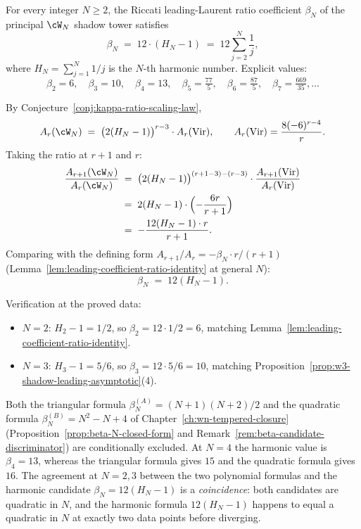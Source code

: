 \begin{conjecture}
\label{conj:beta-N-harmonic-closed-form}
\ClaimStatusConjectured
For every integer $N \ge 2$, the Riccati leading-Laurent ratio coefficient
$\beta_N$ of the principal $\cW_N$ shadow tower satisfies
\begin{equation}
\label{eq:beta-N-closed-form}
\beta_N
\;=\;
12 \cdot (H_N - 1)
\;=\;
12 \sum_{j = 2}^{N} \frac{1}{j},
\end{equation}
where $H_N = \sum_{j=1}^{N} 1/j$ is the $N$-th harmonic number. Explicit
values:
\[
 \beta_2 = 6,\quad \beta_3 = 10,\quad \beta_4 = 13,\quad
 \beta_5 = \tfrac{77}{5},\quad \beta_6 = \tfrac{87}{5},\quad
 \beta_7 = \tfrac{669}{35}, \ldots
\]
\end{conjecture}

\begin{remark}
By Conjecture~\ref{conj:kappa-ratio-scaling-law},
\[
 A_r(\cW_N) \;=\; \bigl(2(H_N - 1)\bigr)^{r-3} \cdot A_r(\mathrm{Vir}),
 \qquad A_r(\mathrm{Vir}) = \frac{8 (-6)^{r-4}}{r}.
\]
Taking the ratio at $r+1$ and $r$:
\begin{align*}
 \frac{A_{r+1}(\cW_N)}{A_r(\cW_N)}
 &\;=\;
 \bigl(2(H_N - 1)\bigr)^{(r+1-3) - (r-3)}
 \cdot \frac{A_{r+1}(\mathrm{Vir})}{A_r(\mathrm{Vir})} \\
 &\;=\;
 2(H_N - 1) \cdot
 \Bigl( -\frac{6 r}{r + 1} \Bigr) \\
 &\;=\;
 -\frac{12 (H_N - 1) \cdot r}{r + 1}.
\end{align*}
Comparing with the defining form $A_{r+1}/A_r = -\beta_N \cdot r / (r + 1)$
(Lemma~\ref{lem:leading-coefficient-ratio-identity} at general $N$):
\[
 \beta_N \;=\; 12 (H_N - 1).
\]

Verification at the proved data:
\begin{itemize}[nosep]
\item $N = 2$: $H_2 - 1 = 1/2$, so $\beta_2 = 12 \cdot 1/2 = 6$,
 matching Lemma~\ref{lem:leading-coefficient-ratio-identity}.
\item $N = 3$: $H_3 - 1 = 5/6$, so $\beta_3 = 12 \cdot 5/6 = 10$,
 matching Proposition~\ref{prop:w3-shadow-leading-asymptotic}(4).
\end{itemize}
\end{remark}

\begin{corollary}
\label{cor:candidate-A-B-retracted}
\ClaimStatusConditional
Both the triangular formula $\beta_N^{(A)} = (N+1)(N+2)/2$ and the
quadratic formula $\beta_N^{(B)} = N^2 - N + 4$ of Chapter~\ref{ch:wn-tempered-closure}
(Proposition~\ref{prop:beta-N-closed-form} and
Remark~\ref{rem:beta-candidate-discriminator})
are conditionally excluded. At $N = 4$ the harmonic value is $\beta_4 = 13$, whereas
the triangular formula gives $15$ and the quadratic formula gives $16$.
The agreement at $N = 2, 3$ between the two polynomial formulas and
the harmonic candidate $\beta_N = 12(H_N-1)$
is a \emph{coincidence}: both candidates are quadratic in $N$, and the
harmonic formula $12(H_N - 1)$ happens to equal a quadratic in $N$ at exactly
two data points before diverging.
\end{corollary}

